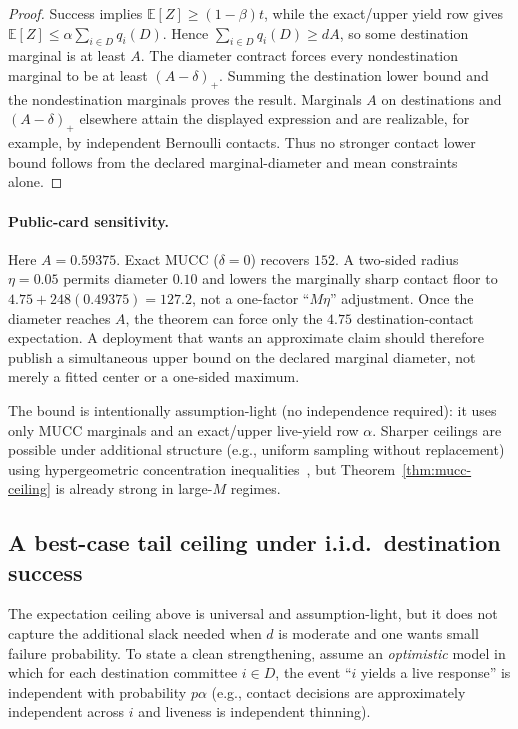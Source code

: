 \documentclass[11pt]{article}
\newcommand{\E}{\mathbb{E}}
\begin{document}
\begin{proof}
Success implies $\E[Z]\ge(1-\beta)t$, while the exact/upper yield row gives
$\E[Z]\le\alpha\sum_{i\in D}q_i(D)$.  Hence
$\sum_{i\in D}q_i(D)\ge dA$, so some destination marginal is at least $A$.  The diameter contract forces every nondestination marginal to be at least $(A-\delta)_+$.  Summing the destination lower bound and the nondestination marginals proves the result.  Marginals $A$ on destinations and $(A-\delta)_+$ elsewhere attain the displayed expression and are realizable, for example, by independent Bernoulli contacts.  Thus no stronger contact lower bound follows from the declared marginal-diameter and mean constraints alone.
\end{proof}

\paragraph{Public-card sensitivity.}
Here $A=0.59375$.  Exact MUCC ($\delta=0$) recovers $152$.  A two-sided radius $\eta=0.05$ permits diameter $0.10$ and lowers the marginally sharp contact floor to
$4.75+248(0.49375)=127.2$, not a one-factor ``$M\eta$'' adjustment.  Once the diameter reaches $A$, the theorem can force only the $4.75$ destination-contact expectation.  A deployment that wants an approximate claim should therefore publish a simultaneous upper bound on the declared marginal diameter, not merely a fitted center or a one-sided maximum.


The bound is intentionally assumption-light (no independence required): it uses only MUCC marginals and an exact/upper live-yield row $\alpha$.
Sharper ceilings are possible under additional structure (e.g., uniform sampling without replacement) using hypergeometric concentration inequalities~\cite{serfling1974sampling,bardenet2015withoutreplacement}, but Theorem~\ref{thm:mucc-ceiling} is already strong in large-$M$ regimes.


\subsection{A best-case tail ceiling under i.i.d.\ destination success}
The expectation ceiling above is universal and assumption-light, but it does not capture the additional slack needed when $d$ is moderate and one wants small failure probability.
To state a clean strengthening, assume an \emph{optimistic} model in which for each destination committee $i\in D$,
the event ``$i$ yields a live response'' is independent with probability $p\alpha$ (e.g., contact decisions are approximately independent across $i$ and liveness is independent thinning).
\end{document}
